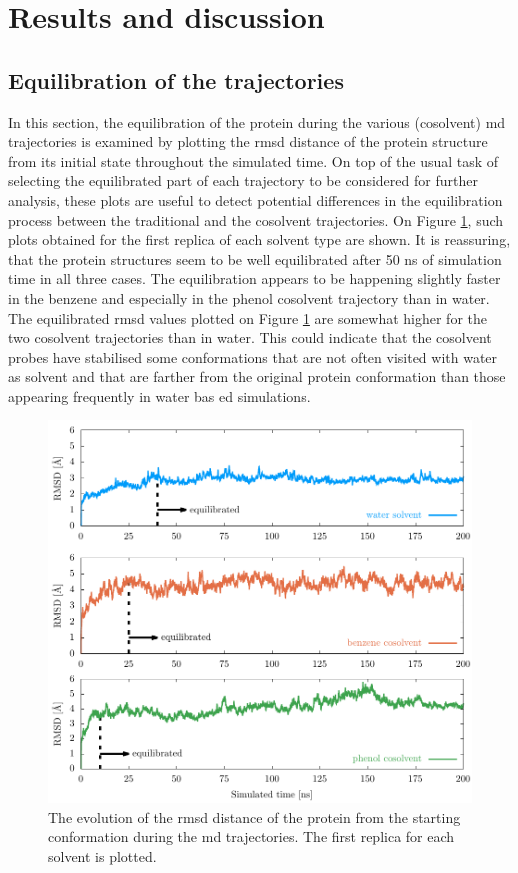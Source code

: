 \section{Results and discussion}

\subsection{Equilibration of the trajectories}
In this section, the equilibration of the protein during the various (cosolvent) \gls{md} trajectories is examined by plotting the \gls{rmsd} distance of the protein structure from its initial state throughout the simulated time.
On top of the usual task of selecting the equilibrated part of each trajectory to be considered for further analysis, these plots are useful to detect potential differences in the equilibration process between the traditional and the cosolvent trajectories.
On Figure \ref{fig:rmsd_equilib}, such plots obtained for the first replica of each solvent type are shown.
It is reassuring, that the protein structures seem to be well equilibrated after 50 ns of simulation time in all three cases.
The equilibration appears to be happening slightly faster in the benzene and especially in the phenol cosolvent trajectory than in water.
The equilibrated \gls{rmsd} values plotted on Figure \ref{fig:rmsd_equilib} are somewhat higher for the two cosolvent trajectories than in water.
This could indicate that the cosolvent probes have stabilised some conformations that are not often visited with water as solvent and that are farther from
the original protein conformation than those appearing frequently in water bas
ed simulations.
\begin{figure}
\centering
\includegraphics[width=\textwidth]{sections/results/images/rmsd_equilib/to_pdf/rmsd_equilib_to_pdf.pdf}
\caption{The evolution of the \gls{rmsd} distance of the protein from the starting conformation during the \gls{md} trajectories. The first replica for each solvent is plotted.}
\label{fig:rmsd_equilib}
\end{figure}


